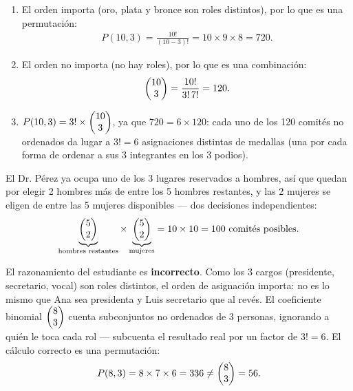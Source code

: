 \begin{solproblema}[prob:490657c]
	\begin{enumerate}
		\item El orden importa (oro, plata y bronce son roles distintos), por lo que es una permutación:
		\begin{align}
			P(10,3) = \frac{10!}{(10-3)!} = 10 \times 9 \times 8 = 720.
		\end{align}
		\item El orden no importa (no hay roles), por lo que es una combinación:
		\begin{align}
			\begin{pmatrix} 10 \\ 3\end{pmatrix} = \frac{10!}{3!\,7!} = 120.
		\end{align}
		\item $P(10,3) = 3! \times \begin{pmatrix} 10 \\ 3\end{pmatrix}$, ya que $720 = 6 \times 120$: cada uno de los 120 comités no ordenados da lugar a $3! = 6$ asignaciones distintas de medallas (una por cada forma de ordenar a sus 3 integrantes en los 3 podios).
	\end{enumerate}
\end{solproblema}

\begin{solproblema}[prob:d8ce0cf]
	El Dr. Pérez ya ocupa uno de los 3 lugares reservados a hombres, así que quedan por elegir 2 hombres más de entre los 5 hombres restantes, y las 2 mujeres se eligen de entre las 5 mujeres disponibles — dos decisiones independientes:
	\begin{align}
		\underbrace{\begin{pmatrix} 5 \\ 2\end{pmatrix}}_{\text{hombres restantes}} \times \underbrace{\begin{pmatrix} 5 \\ 2\end{pmatrix}}_{\text{mujeres}} = 10 \times 10 = 100 \text{ comités posibles.}
	\end{align}
\end{solproblema}

\begin{solproblema}[prob:3007304]
	El razonamiento del estudiante es \textbf{incorrecto}. Como los 3 cargos (presidente, secretario, vocal) son roles distintos, el orden de asignación importa: no es lo mismo que Ana sea presidenta y Luis secretario que al revés. El coeficiente binomial $\begin{pmatrix} 8 \\ 3\end{pmatrix}$ cuenta subconjuntos no ordenados de 3 personas, ignorando a quién le toca cada rol — subcuenta el resultado real por un factor de $3! = 6$. El cálculo correcto es una permutación:
	\begin{align}
		P(8,3) = 8 \times 7 \times 6 = 336 \neq \begin{pmatrix} 8 \\ 3\end{pmatrix} = 56.
	\end{align}
\end{solproblema}

